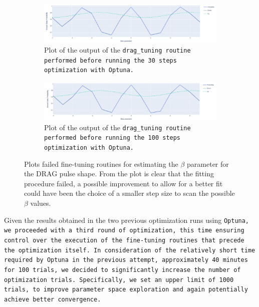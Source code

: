 \begin{figure}[h!]
        \centering
    \begin{subfigure}[t]{0.45\textwidth}
        \includegraphics[width=\textwidth]{figures/png/RB_optimization/beta30.png}
        \caption{Plot of the output of the \tt{drag\_tuning} routine performed before running the 30 steps optimization with \tt{Optuna}.}
        \label{fig:failed_beta:30}
    \end{subfigure}
    \hfill
    \begin{subfigure}[t]{0.45\textwidth}
        \includegraphics[width=\textwidth]{figures/png/RB_optimization/beta100.png}
        \caption{Plot of the output of the \tt{drag\_tuning} routine performed before running the 100 steps optimization with \tt{Optuna}.}
        \label{fig:failed_beta:100}
    \end{subfigure}

    \caption{Plots failed fine-tuning routines for estimating the $\beta$ parameter for the DRAG pulse shape. 
    From the plot is clear that the fitting procedure failed, a possible improvement to allow for a better fit could have been the choice of a smaller step size to scan the possible $\beta$ values.}
    \label{fig:failed_beta}
\end{figure}

Given the results obtained in the two previous optimization runs using \tt{Optuna}, we proceeded with a third round of optimization, this time ensuring control over the execution of the fine-tuning routines that precede the optimization itself. 
In consideration of the relatively short time required by \tt{Optuna} in the previous attempt, approximately 40 minutes for 100 trials, we decided to significantly increase the number of optimization trials. 
Specifically, we set an upper limit of 1000 trials, to improve parameter space exploration and again potentially achieve better convergence.

